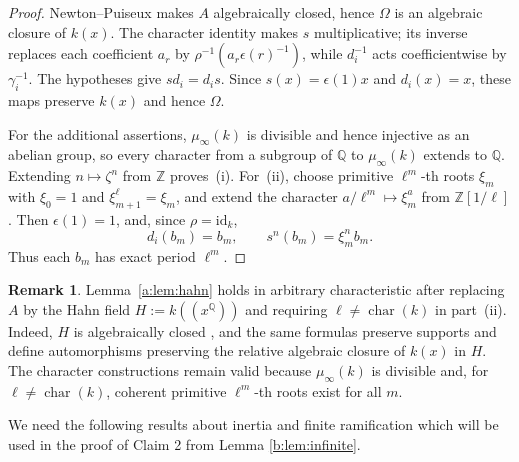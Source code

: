 \documentclass[10pt,a4paper]{amsart}
\theoremstyle{definition}
\newtheorem{remark}[theorem]{Remark}
\newcommand{\Q}{\mathbb Q}
\newcommand{\Z}{\mathbb Z}
\DeclareMathOperator{\charac}{char}
\begin{document}
\begin{proof}
Newton--Puiseux makes $A$ algebraically closed, hence
$\Omega$ is an algebraic closure of $k(x)$.
The character identity makes $s$ multiplicative;
its inverse replaces each coefficient $a_r$ by
$\rho^{-1}(a_r\epsilon(r)^{-1})$, while $d_i^{-1}$
acts coefficientwise by $\gamma_i^{-1}$.
The hypotheses give $sd_i=d_is$.
Since $s(x)=\epsilon(1)x$ and $d_i(x)=x$, these maps
preserve $k(x)$ and hence $\Omega$.

For the additional assertions, $\mu_\infty(k)$ is divisible
and hence injective as an abelian group, so every character
from a subgroup of $\Q$ to $\mu_\infty(k)$ extends to $\Q$.
Extending $n\mapsto\zeta^n$ from $\Z$ proves~\textup{(i)}.
For~\textup{(ii)}, choose primitive $\ell^m$-th roots $\xi_m$
with $\xi_0=1$ and $\xi_{m+1}^{\ell}=\xi_m$, and extend
the character $a/\ell^m\mapsto\xi_m^a$ from $\Z[1/\ell]$.
Then $\epsilon(1)=1$, and, since $\rho=\mathrm{id}_k$,
\[
d_i(b_m)=b_m,\qquad s^n(b_m)=\xi_m^n b_m.
\]
Thus each $b_m$ has exact period $\ell^m$.
\end{proof}
\begin{remark}\label{pposit}
Lemma~\ref{a:lem:hahn} holds in arbitrary characteristic
after replacing $A$ by the Hahn field $H:=k((x^{\Q}))$
and requiring $\ell\ne\charac(k)$ in part~\textup{(ii)}.
Indeed, $H$ is algebraically closed
\cite[Corollary~4]{Poonen}, and the same formulas preserve
supports and define automorphisms preserving the relative
algebraic closure of $k(x)$ in $H$.
The character constructions remain valid because
$\mu_\infty(k)$ is divisible and, for
$\ell\ne\charac(k)$, coherent primitive $\ell^m$-th
roots exist for all $m$.
\end{remark}
We need the following results about inertia and finite ramification which will be used in the proof of Claim 2 from Lemma \ref{b:lem:infinite}.
\end{document}
